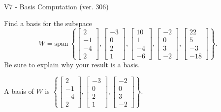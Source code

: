 \begin{exercise}
  \begin{exerciseTitle}V7 - Basis Computation (ver. 306)\end{exerciseTitle}
  \begin{exerciseStatement}
    Find a basis for the subspace 
\[W=\mathrm{span}\ \left\{\left[\begin{array}{r}
2 \\
-1 \\
-4 \\
2
\end{array}\right] , \left[\begin{array}{r}
-3 \\
0 \\
2 \\
1
\end{array}\right] , \left[\begin{array}{r}
10 \\
1 \\
-4 \\
-6
\end{array}\right] , \left[\begin{array}{r}
-2 \\
0 \\
3 \\
-2
\end{array}\right] , \left[\begin{array}{r}
22 \\
5 \\
-3 \\
-18
\end{array}\right]\right\}.\]
 Be sure to explain why your result is a basis.


  \end{exerciseStatement}
  \begin{exerciseAnswer}
   A basis of \(W\) is  \(\left\{\left[\begin{array}{r}
2 \\
-1 \\
-4 \\
2
\end{array}\right] , \left[\begin{array}{r}
-3 \\
0 \\
2 \\
1
\end{array}\right] , \left[\begin{array}{r}
-2 \\
0 \\
3 \\
-2
\end{array}\right]\right\}\).
  


  \end{exerciseAnswer}
\end{exercise}